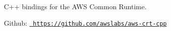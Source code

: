 C++ bindings for the AWS Common Runtime.

Github\+: \href{https://github.com/awslabs/aws-crt-cpp}{\texttt{ https\+://github.\+com/awslabs/aws-\/crt-\/cpp}} 